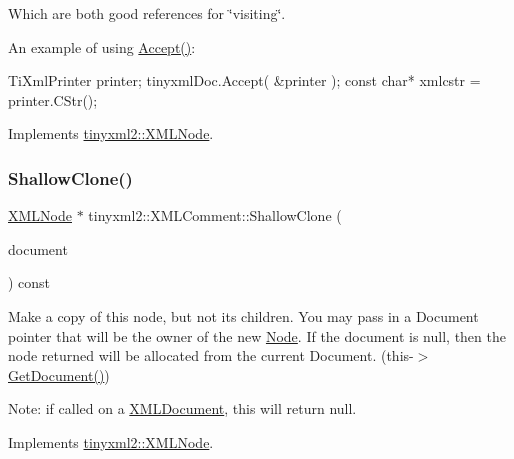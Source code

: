 Which are both good references for \char`\"{}visiting\char`\"{}.

An example of using \hyperlink{classtinyxml2_1_1XMLComment_a27b37d16cea01b5329dfbbb4f9508e39}{Accept()}\+: \begin{DoxyVerb}TiXmlPrinter printer;
tinyxmlDoc.Accept( &printer );
const char* xmlcstr = printer.CStr();
\end{DoxyVerb}
 

Implements \hyperlink{classtinyxml2_1_1XMLNode_a81e66df0a44c67a7af17f3b77a152785}{tinyxml2\+::\+X\+M\+L\+Node}.

\mbox{\label{classtinyxml2_1_1XMLComment_adf5b5c0319351dcc339df098d11e8fb2}} 
\subsubsection{\texorpdfstring{Shallow\+Clone()}{ShallowClone()}\hspace{0.1cm}{\footnotesize\ttfamily [1/2]}}
{\footnotesize\ttfamily \hyperlink{classtinyxml2_1_1XMLNode}{X\+M\+L\+Node} $\ast$ tinyxml2\+::\+X\+M\+L\+Comment\+::\+Shallow\+Clone (\begin{DoxyParamCaption}\item[{\hyperlink{classtinyxml2_1_1XMLDocument}{X\+M\+L\+Document} $\ast$}]{document }\end{DoxyParamCaption}) const\hspace{0.3cm}{\ttfamily [virtual]}}

Make a copy of this node, but not its children. You may pass in a Document pointer that will be the owner of the new \hyperlink{classNode}{Node}. If the \textquotesingle{}document\textquotesingle{} is null, then the node returned will be allocated from the current Document. (this-\/$>$\hyperlink{classtinyxml2_1_1XMLNode_af343d1ef0b45c0020e62d784d7e67a68}{Get\+Document()})

Note\+: if called on a \hyperlink{classtinyxml2_1_1XMLDocument}{X\+M\+L\+Document}, this will return null. 

Implements \hyperlink{classtinyxml2_1_1XMLNode_a8402cbd3129d20e9e6024bbcc0531283}{tinyxml2\+::\+X\+M\+L\+Node}.

\mbox{\label{classtinyxml2_1_1XMLComment_a08991cc63fadf7e95078ac4f9ea1b073}} 
